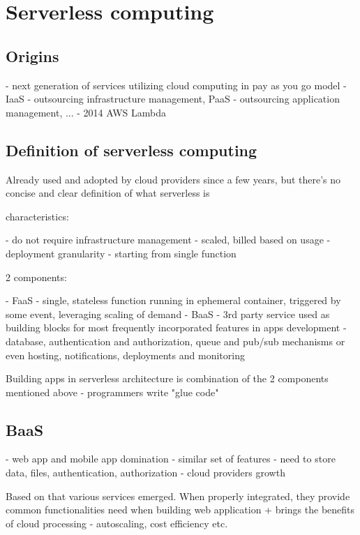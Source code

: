 \chapter{Serverless computing}

\section*{Origins}

- next generation of services utilizing cloud computing in pay as you go model
- IaaS - outsourcing infrastructure management, PaaS - outsourcing application management, ...
- 2014 AWS Lambda

\section*{Definition of serverless computing}

Already used and adopted by cloud providers since a few years, but there's no concise and clear definition of what serverless is

characteristics:

- do not require infrastructure management
- scaled, billed based on usage
- deployment granularity - starting from single function

2 components:

- FaaS - single, stateless function running in ephemeral container, triggered by some event, leveraging scaling of demand
- BaaS - 3rd party service used as building blocks for most frequently incorporated features in apps development - database, authentication and authorization, queue and pub/sub mechanisms or even hosting, notifications, deployments and monitoring

Building apps in serverless architecture is combination of the 2 components mentioned above - programmers write "glue code"

\section*{BaaS}

- web app and mobile app domination
- similar set of features - need to store data, files, authentication, authorization
- cloud providers growth

Based on that various services emerged. When properly integrated, they provide common functionalities need when building web application + brings the benefits of cloud processing - autoscaling, cost efficiency etc.

